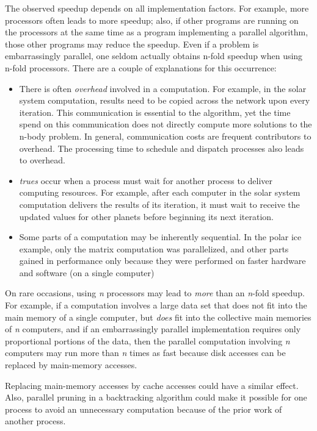\documentclass[letterpaper,10pt,openany,oneside]{sphinxmanual}
\begin{document}
The observed speedup depends on all implementation factors.  For example, more processors often leads to more speedup; also, if other programs are running on the processors at the same time as a program implementing a parallel algorithm, those other programs may reduce the speedup.  Even if a problem is embarrassingly parallel, one seldom actually obtains n-fold speedup when using n-fold processors.  There are a couple of explanations for this occurrence:
\begin{itemize}
\item {} 
There is often \emph{overhead} involved in a computation. For example, in the solar system computation, results need to be copied across the network upon every iteration. This communication is essential to the algorithm, yet the time spend on this communication does not directly compute more solutions to the n-body problem.
In general, communication costs are frequent contributors to overhead. The processing time to schedule and dispatch processes also leads to overhead.

\item {} 
\emph{trues} occur when a process must wait for another process to deliver computing resources. For example, after each computer in the solar system computation delivers the results of its iteration, it must wait to receive the updated values for other planets before beginning its next iteration.

\item {} 
Some parts of a computation may be inherently sequential. In the polar ice example, only the matrix computation was parallelized, and other parts gained in performance only because they were performed on faster hardware and software (on a single computer)

\end{itemize}

On rare occasions, using \emph{n} processors may lead to \emph{more} than an \emph{n}-fold speedup.  For example, if a computation involves a large data set that does not fit into the main memory of a single computer, but \emph{does} fit into the collective main memories of \emph{n} computers, and if an embarrassingly parallel implementation requires only proportional portions of the data, then the parallel computation involving \emph{n} computers may run more than \emph{n} times as fast because disk accesses can be replaced by main-memory accesses.

Replacing main-memory accesses by cache accesses could have a similar effect. Also, parallel pruning in a backtracking algorithm could make it possible for one process to avoid an unnecessary computation because of the prior work of another process.
\end{document}

